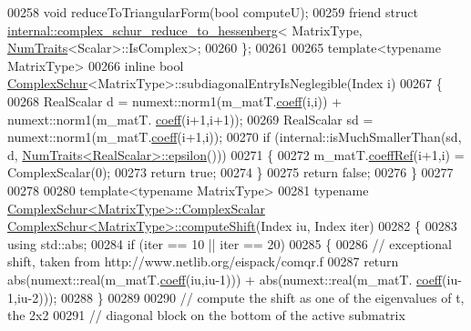 \begin{DoxyCode}
00258     \textcolor{keywordtype}{void} reduceToTriangularForm(\textcolor{keywordtype}{bool} computeU);
00259     \textcolor{keyword}{friend} \textcolor{keyword}{struct }\hyperlink{struct_eigen_1_1internal_1_1complex__schur__reduce__to__hessenberg}{internal::complex\_schur\_reduce\_to\_hessenberg}<
      MatrixType, \hyperlink{group___core___module_struct_eigen_1_1_num_traits}{NumTraits}<Scalar>::IsComplex>;
00260 \};
00261 
00265 template<typename MatrixType>
00266 inline bool \hyperlink{group___eigenvalues___module_class_eigen_1_1_complex_schur}{ComplexSchur}<MatrixType>::subdiagonalEntryIsNeglegible(Index i)
00267 \{
00268   RealScalar d = numext::norm1(m\_matT.\hyperlink{class_eigen_1_1_plain_object_base_afbfc12954f16d21aedb7bd839f64a278}{coeff}(i,i)) + numext::norm1(m\_matT.
      \hyperlink{class_eigen_1_1_plain_object_base_afbfc12954f16d21aedb7bd839f64a278}{coeff}(i+1,i+1));
00269   RealScalar sd = numext::norm1(m\_matT.\hyperlink{class_eigen_1_1_plain_object_base_afbfc12954f16d21aedb7bd839f64a278}{coeff}(i+1,i));
00270   \textcolor{keywordflow}{if} (internal::isMuchSmallerThan(sd, d, \hyperlink{group___core___module_struct_eigen_1_1_num_traits}{NumTraits<RealScalar>::epsilon}()))
00271   \{
00272     m\_matT.\hyperlink{class_eigen_1_1_plain_object_base_a25626a55b26a4323565f79d1b7c48ea8}{coeffRef}(i+1,i) = ComplexScalar(0);
00273     \textcolor{keywordflow}{return} \textcolor{keyword}{true};
00274   \}
00275   \textcolor{keywordflow}{return} \textcolor{keyword}{false};
00276 \}
00277 
00278 
00280 \textcolor{keyword}{template}<\textcolor{keyword}{typename} MatrixType>
00281 \textcolor{keyword}{typename} \hyperlink{group___eigenvalues___module_class_eigen_1_1_complex_schur}{ComplexSchur<MatrixType>::ComplexScalar} 
      \hyperlink{group___eigenvalues___module_class_eigen_1_1_complex_schur}{ComplexSchur<MatrixType>::computeShift}(Index iu, Index iter)
00282 \{
00283   \textcolor{keyword}{using} std::abs;
00284   \textcolor{keywordflow}{if} (iter == 10 || iter == 20) 
00285   \{
00286     \textcolor{comment}{// exceptional shift, taken from http://www.netlib.org/eispack/comqr.f}
00287     \textcolor{keywordflow}{return} abs(numext::real(m\_matT.\hyperlink{class_eigen_1_1_plain_object_base_afbfc12954f16d21aedb7bd839f64a278}{coeff}(iu,iu-1))) + abs(numext::real(m\_matT.
      \hyperlink{class_eigen_1_1_plain_object_base_afbfc12954f16d21aedb7bd839f64a278}{coeff}(iu-1,iu-2)));
00288   \}
00289 
00290   \textcolor{comment}{// compute the shift as one of the eigenvalues of t, the 2x2}
00291   \textcolor{comment}{// diagonal block on the bottom of the active submatrix}

\end{DoxyCode}
